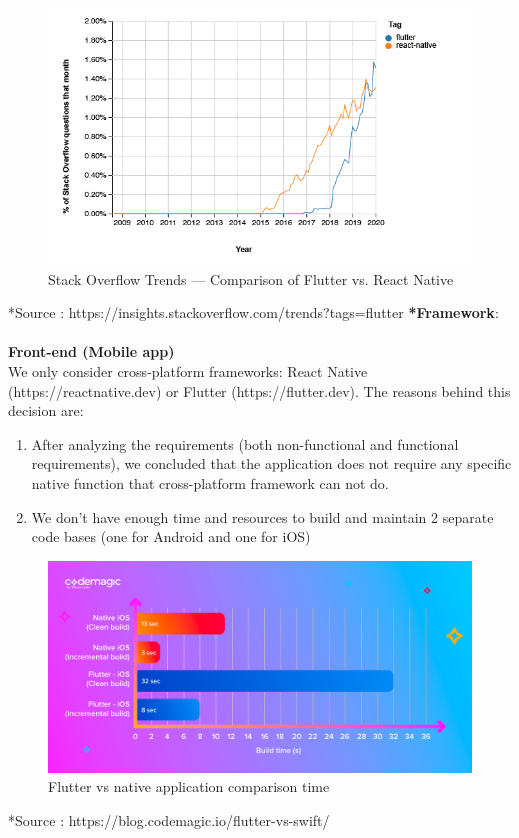 \documentclass{article}
\begin{document}
\begin{figure}[h!]
    \centering
    \includegraphics[scale=0.7]{Images/MobileTrend.png}
    \caption{Stack Overflow Trends — Comparison of Flutter vs. React Native}
    \label{fig:cookingbook}
\end{figure}
*Source : https://insights.stackoverflow.com/trends?tags=flutter%
\newpage
\textbf{*Framework}: \\\\
\textbf{Front-end (Mobile app) } \\
\qquad We only consider cross-platform frameworks: React Native (https://reactnative.dev) or Flutter (https://flutter.dev). The reasons behind this decision are:
 \begin{enumerate}
        \item After analyzing the requirements (both non-functional and functional requirements), we concluded that the application does not require any specific native function that cross-platform framework can not do.
        \item We don’t have enough time and resources to build and maintain 2 separate code bases (one for Android and one for iOS)
\end{enumerate}
\begin{figure}[h!]
    \centering
    \includegraphics[scale=0.3]{Images/CM_Swift-vs-Flutter_build-time.png}
    \caption{Flutter vs native application comparison time}
    \label{fig:cookingbook}
\end{figure}
*Source : https://blog.codemagic.io/flutter-vs-swift/ \\\\
\end{document}
